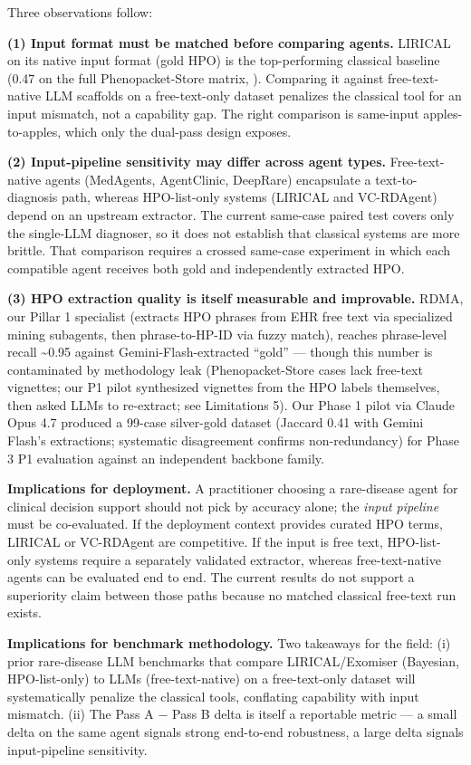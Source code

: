 Three observations follow:

\textbf{(1) Input format must be matched before comparing agents.} LIRICAL on its native input format (gold HPO) is the top-performing classical baseline (0.47 on the full Phenopacket-Store matrix, ). Comparing it against free-text-native LLM scaffolds on a free-text-only dataset penalizes the classical tool for an input mismatch, not a capability gap. The right comparison is same-input apples-to-apples, which only the dual-pass design exposes.

\textbf{(2) Input-pipeline sensitivity may differ across agent types.} Free-text-native
agents (MedAgents, AgentClinic, DeepRare) encapsulate a text-to-diagnosis path,
whereas HPO-list-only systems (LIRICAL and VC-RDAgent) depend on an upstream
extractor. The current same-case paired test covers only the single-LLM
diagnoser, so it does not establish that classical systems are more brittle.
That comparison requires a crossed same-case experiment in which each
compatible agent receives both gold and independently extracted HPO.

\textbf{(3) HPO extraction quality is itself measurable and improvable.} RDMA, our Pillar 1 specialist (extracts HPO phrases from EHR free text via specialized mining subagents, then phrase-to-HP-ID via fuzzy match), reaches phrase-level recall \textasciitilde0.95 against Gemini-Flash-extracted ``gold'' --- though this number is contaminated by methodology leak (Phenopacket-Store cases lack free-text vignettes; our P1 pilot synthesized vignettes from the HPO labels themselves, then asked LLMs to re-extract; see Limitations 5). Our Phase 1 pilot via Claude Opus 4.7 produced a 99-case silver-gold dataset (Jaccard 0.41 with Gemini Flash's extractions; systematic disagreement confirms non-redundancy) for Phase 3 P1 evaluation against an independent backbone family.

\textbf{Implications for deployment.} A practitioner choosing a rare-disease agent
for clinical decision support should not pick by accuracy alone; the \emph{input
pipeline} must be co-evaluated. If the deployment context provides curated HPO
terms, LIRICAL or VC-RDAgent are competitive. If the input is free text,
HPO-list-only systems require a separately validated extractor, whereas
free-text-native agents can be evaluated end to end. The current results do
not support a superiority claim between those paths because no matched
classical free-text run exists.

\textbf{Implications for benchmark methodology.} Two takeaways for the field: (i) prior rare-disease LLM benchmarks that compare LIRICAL/Exomiser (Bayesian, HPO-list-only) to LLMs (free-text-native) on a free-text-only dataset will systematically penalize the classical tools, conflating capability with input mismatch. (ii) The Pass A \ensuremath{-} Pass B delta is itself a reportable metric --- a small delta on the same agent signals strong end-to-end robustness, a large delta signals input-pipeline sensitivity.

